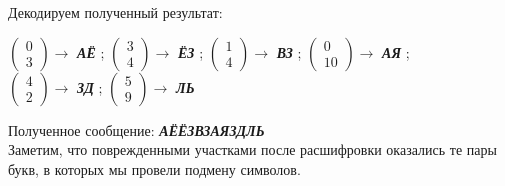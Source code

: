 \documentclass[a5paper, 10pt]{article}
\theoremstyle{definition}
\theoremstyle{plain}
\theoremstyle{remark}
\begin{document}
Декодируем полученный результат:
\begin{center}
 $ \begin{pmatrix}
0\\
3
\end{pmatrix} \to$ \textbf{\textit{АЁ}} ;
 $ \begin{pmatrix}
3\\
4
\end{pmatrix} \to$ \textbf{\textit{ЁЗ}} ;
 $ \begin{pmatrix}
1\\
4
\end{pmatrix} \to$ \textbf{\textit{ВЗ}} ;
 $ \begin{pmatrix}
0\\
10
\end{pmatrix} \to$ \textbf{\textit{АЯ}} ; \\
 $ \begin{pmatrix}
4\\
2
\end{pmatrix} \to$ \textbf{\textit{ЗД}} ;
$\begin{pmatrix}
5\\
9
\end{pmatrix} \to$ \textbf{\textit{ЛЬ}}  \\
\end{center}
Полученное сообщение:  \textbf{\textit{\colorbox{red! 50}{АЁ}\colorbox{green! 50}{ЁЗ}\colorbox{red! 50}{ВЗ}\colorbox{green! 50}{АЯ}\colorbox{red! 50}{ЗД}\colorbox{green! 50}{ЛЬ}}}\\
Заметим, что поврежденными участками после расшифровки оказались те пары букв, в которых мы провели подмену символов.\\
\end{document}
